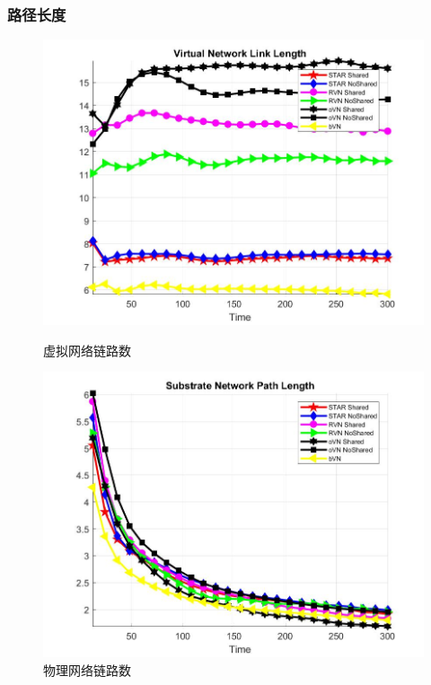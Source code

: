 \begin{frame}
\frametitle{路径长度}
\begin{figure}[htbp]
\centering
\begin{minipage}{0.4\textwidth}
\centering
\includegraphics[width=\textwidth]{figures/PathLengthAverageVirtualNetwork}
\caption{虚拟网络链路数}\label{fig:PathLengthAverageVirtualNetwork}
\end{minipage}
\begin{minipage}{0.4\textwidth}
\centering
\includegraphics[width=\textwidth]{figures/PathLengthAverageSubstrateNetwork}
\caption{物理网络链路数}\label{fig:PathLengthAverageSubstrateNetwork}
\end{minipage}
\begin{minipage}{0.4\textwidth}

\end{minipage}
\end{figure}
\end{frame}
